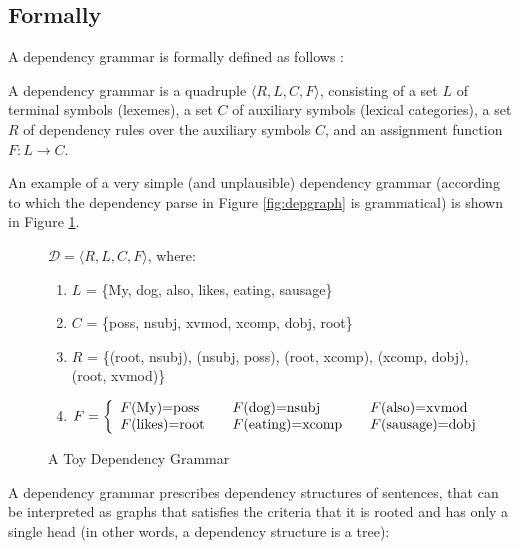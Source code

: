 \subsection{Formally}

A dependency grammar is formally defined as follows \citep{hays1964dependency,gaifman1965dependency}:

\begin{definition}\label{def:depgram}
A dependency grammar is a quadruple $\langle R,L,C,F\rangle$, consisting of a set $L$ of terminal symbols (lexemes), a set $C$ of auxiliary symbols (lexical categories), a set $R$ of dependency rules over the auxiliary symbols $C$, and an assignment function $F : L\rightarrow C$.
\end{definition}

An example of a very simple (and unplausible) dependency grammar (according to which the dependency parse in Figure \ref{fig:depgraph} is grammatical) is shown in Figure \ref{fig:depgrammar}.

\begin{figure}[!ht]
\begin{framed}
$\mathcal{D} = \langle R,L,C,F\rangle$, where:\begin{enumerate}
\item[] $L$ = \{My, dog, also, likes, eating, sausage\}
\item[] $C$ = \{poss, nsubj, xvmod, xcomp, dobj, root\}
\item[] $R$ = \{(root, nsubj), (nsubj, poss), (root, xcomp), (xcomp, dobj), (root, xvmod)\}
\item[] $F = \left\{
  \begin{array}{l l l}
	F\text{(My)=poss} & \quad F\text{(dog)=nsubj} & \quad F\text{(also)=xvmod}\\
	F\text{(likes)=root}& \quad F\text{(eating)=xcomp} & \quad F\text{(sausage)=dobj} 
  \end{array} \right.$
\end{enumerate}
\end{framed}
\caption{A Toy Dependency Grammar}\label{fig:depgrammar}
\end{figure}


\noindent A dependency grammar prescribes dependency structures of sentences, that can be interpreted as graphs that satisfies the criteria that it is rooted and has only a single head (in other words, a dependency structure is a tree):


